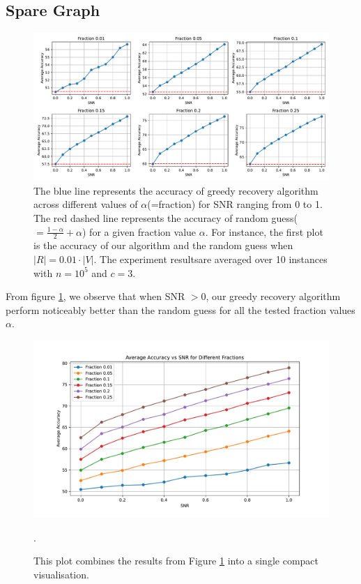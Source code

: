 \subsection{Spare Graph}
\begin{figure}[H]
    \centering
    \includegraphics[width=1\linewidth]{Figures/Greedy_Recovery_Sparse_50000_1.pdf}
    \caption[Accuracy of greedy recovery algorithm for sparse graph]{The blue line represents the accuracy of greedy recovery algorithm across different values of $\alpha$(=fraction) for SNR ranging from 0 to 1. The red dashed line represents the accuracy of random guess($=\frac{1-\alpha}{2}+\alpha$) for a given fraction value $\alpha$. For instance, the first plot is the accuracy of our algorithm and the random guess when $|R|=0.01\cdot|V|.$ The experiment results\protect\footnotemark are averaged over 10 instances with $n=10^5$ and $c=3.$}
    \label{fig:greedy_sparse}
\end{figure}
From figure \ref{fig:greedy_sparse}, we observe that when SNR $>0$, our greedy recovery algorithm perform noticeably better than the random guess  for all the tested fraction values $\alpha.$\\
\begin{figure}[ht]
    \centering
    \includegraphics[width=1\linewidth]{Figures/Greedy_Recovery_Sparse_50000_2.pdf}
    \caption[A compact version of the accuracy of greedy recovery algorithm for sparse graph]{This plot combines the results from Figure \ref{fig:greedy_sparse} into a single compact visualisation.}.
    \label{fig: compact_sparse}
\end{figure}
